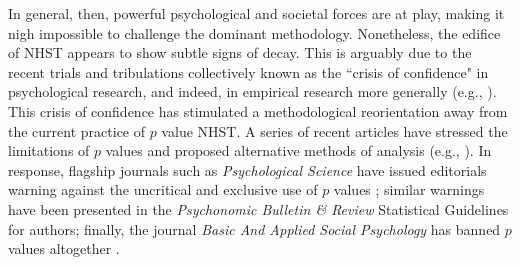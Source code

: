In general, then, powerful psychological and societal forces are at play, making it nigh impossible to challenge the dominant methodology. Nonetheless, the edifice of NHST appears to show subtle signs of decay. This is arguably due to the recent trials and tribulations collectively known as the ``crisis of confidence" in psychological research, and indeed, in empirical research more generally (e.g., ). This crisis of confidence has stimulated a methodological reorientation away from the current practice of $p$ value NHST. A series of recent articles have stressed the limitations of $p$ values and proposed alternative methods of analysis (e.g., ). In response, flagship journals such as \emph{Psychological Science} have issued editorials warning against the uncritical and exclusive use of $p$ values \cite{Lindsay2015}; similar warnings have been presented in the \emph{Psychonomic Bulletin \& Review} Statistical Guidelines for authors; finally, the journal \emph{Basic And Applied Social Psychology} has banned $p$ values altogether \cite{TrafimowMarks2015}.

